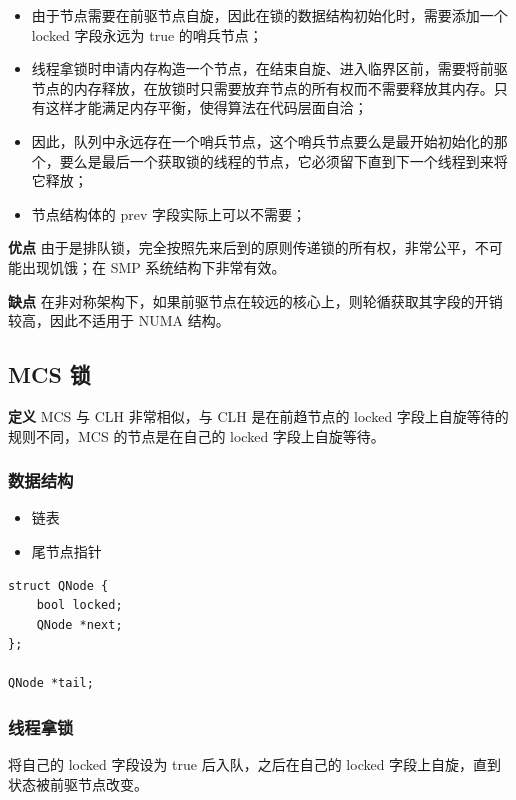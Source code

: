 \documentclass[UTF8]{ctexart}
\begin{document}
\begin{itemize}
    \item 由于节点需要在前驱节点自旋，因此在锁的数据结构初始化时，需要添加一个 locked 字段永远为 true 的哨兵节点；
    \item 线程拿锁时申请内存构造一个节点，在结束自旋、进入临界区前，需要将前驱节点的内存释放，在放锁时只需要放弃节点的所有权而不需要释放其内存。只有这样才能满足内存平衡，使得算法在代码层面自洽；
    \item 因此，队列中永远存在一个哨兵节点，这个哨兵节点要么是最开始初始化的那个，要么是最后一个获取锁的线程的节点，它必须留下直到下一个线程到来将它释放；
    \item 节点结构体的 prev 字段实际上可以不需要；
\end{itemize}

\textbf{优点} 由于是排队锁，完全按照先来后到的原则传递锁的所有权，非常公平，不可能出现饥饿；在 SMP 系统结构下非常有效。

\textbf{缺点} 在非对称架构下，如果前驱节点在较远的核心上，则轮循获取其字段的开销较高，因此不适用于 NUMA 结构。

\subsection{MCS 锁}

\textbf{定义} MCS 与 CLH 非常相似，与 CLH 是在前趋节点的 locked 字段上自旋等待的规则不同，MCS 的节点是在自己的 locked 字段上自旋等待。

\subsubsection{数据结构}
\begin{itemize}
    \item 链表
    \item 尾节点指针
\end{itemize}

\begin{lstlisting}
struct QNode {
    bool locked;
    QNode *next;
};

QNode *tail;
\end{lstlisting}

\subsubsection{线程拿锁}

将自己的 locked 字段设为 true 后入队，之后在自己的 locked 字段上自旋，直到状态被前驱节点改变。
\end{document}
